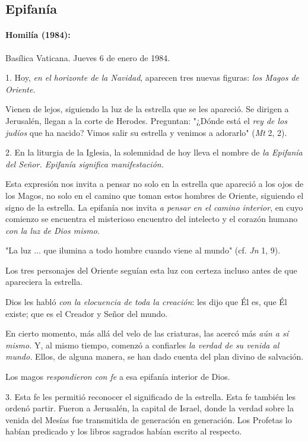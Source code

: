 \begin{body}
\chapter{Epifanía}

\subsubsection{Homilía (1984): }

Basílica Vaticana. Jueves 6 de enero de 1984.

1. Hoy, \emph{en el horizonte de la Navidad}, aparecen tres nuevas figuras: \emph{los Magos de Oriente.}

Vienen de lejos, siguiendo la luz de la estrella que se les apareció. Se dirigen a Jerusalén, llegan a la corte de Herodes. Preguntan: "¿Dónde está el \emph{rey de los judíos} que ha nacido? Vimos salir su estrella y venimos a adorarlo" (\emph{Mt} 2, 2).

2. En la liturgia de la Iglesia, la solemnidad de hoy lleva el nombre de \emph{la Epifanía del Señor. Epifanía significa manifestación.}

Esta expresión nos invita a pensar no solo en la estrella que apareció a los ojos de los Magos, no solo en el camino que toman estos hombres de Oriente, siguiendo el signo de la estrella. La epifanía nos invita \emph{a pensar en el camino interior}, en cuyo comienzo se encuentra el misterioso encuentro del intelecto y el corazón humano \emph{con la luz de Dios mismo.}

"La luz ... que ilumina a todo hombre cuando viene al mundo" (cf. \emph{Jn} 1, 9).

Los tres personajes del Oriente seguían esta luz con certeza incluso antes de que apareciera la estrella.

Dios les habló \emph{con la elocuencia de toda la creación}: les dijo que Él es, que Él existe; que es el Creador y Señor del mundo.

En cierto momento, más allá del velo de las criaturas, las acercó más \emph{aún a sí mismo.} Y, al mismo tiempo, comenzó a confiarles \emph{la verdad de su venida al mundo.} Ellos, de alguna manera, se han dado cuenta del plan divino de salvación.

Los magos \emph{respondieron con fe} a esa epifanía interior de Dios.

3. Esta fe les permitió reconocer el significado de la estrella. Esta fe también les ordenó partir. Fueron a Jerusalén, la capital de Israel, donde la verdad sobre la venida del Mesías fue transmitida de generación en generación. Los Profetas lo habían predicado y los libros sagrados habían escrito al respecto.


\end{body}

